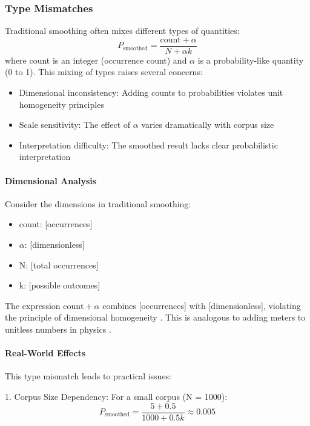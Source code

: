 \documentclass[12pt,a4paper]{article}
\begin{document}
\subsubsection{Type Mismatches}
Traditional smoothing often mixes different types of quantities:
\begin{equation}
    P_{\text{smoothed}} = \frac{\text{count} + \alpha}{N + \alpha k}
\end{equation}
where count is an integer (occurrence count) and $\alpha$ is a probability-like quantity (0 to 1). This mixing of types raises several concerns:

\begin{itemize}
    \item Dimensional inconsistency: Adding counts to probabilities violates unit homogeneity principles \cite{jaynes2003probability}
    \item Scale sensitivity: The effect of $\alpha$ varies dramatically with corpus size
    \item Interpretation difficulty: The smoothed result lacks clear probabilistic interpretation
\end{itemize}

\paragraph{Dimensional Analysis}
Consider the dimensions in traditional smoothing:
\begin{itemize}
    \item count: [occurrences]
    \item $\alpha$: [dimensionless]
    \item N: [total occurrences]
    \item k: [possible outcomes]
\end{itemize}

The expression $\text{count} + \alpha$ combines [occurrences] with [dimensionless], violating the principle of dimensional homogeneity \cite{barenblatt1996scaling, bridgman1922dimensional}. This is analogous to adding meters to unitless numbers in physics \cite{taylor1997introduction}.

\paragraph{Real-World Effects}
This type mismatch leads to practical issues:

1. Corpus Size Dependency:
   For a small corpus (N = 1000):
   \begin{equation}
       P_{\text{smoothed}} = \frac{5 + 0.5}{1000 + 0.5k} \approx 0.005
   \end{equation}
   
\end{document}
